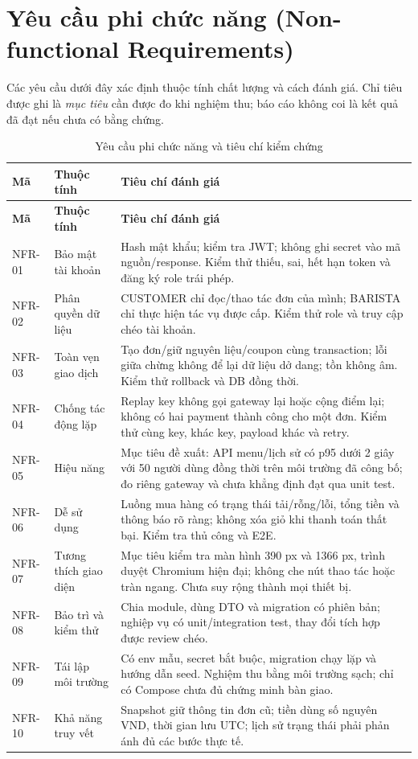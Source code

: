 \section{Yêu cầu phi chức năng (Non-functional Requirements)}
Các yêu cầu dưới đây xác định thuộc tính chất lượng và cách đánh giá.
Chỉ tiêu được ghi là \textit{mục tiêu} cần được đo khi nghiệm thu; báo cáo
không coi là kết quả đã đạt nếu chưa có bằng chứng.
{\small{}
\begin{longtable}{@{}L{0.10\textwidth}L{0.24\textwidth}L{0.59\textwidth}@{}}
\caption{Yêu cầu phi chức năng và tiêu chí kiểm chứng}\label{tab:nonfunctional}\\
\toprule\textbf{Mã} & \textbf{Thuộc tính} & \textbf{Tiêu chí đánh giá} \\\midrule\endfirsthead
\toprule\textbf{Mã} & \textbf{Thuộc tính} & \textbf{Tiêu chí đánh giá} \\\midrule\endhead
\bottomrule\endfoot
NFR-01 & Bảo mật tài khoản & Hash mật khẩu; kiểm tra JWT; không ghi secret vào mã nguồn/response. Kiểm thử thiếu, sai, hết hạn token và đăng ký role trái phép. \\
NFR-02 & Phân quyền dữ liệu & CUSTOMER chỉ đọc/thao tác đơn của mình; BARISTA chỉ thực hiện tác vụ được cấp. Kiểm thử role và truy cập chéo tài khoản. \\
NFR-03 & Toàn vẹn giao dịch & Tạo đơn/giữ nguyên liệu/coupon cùng transaction; lỗi giữa chừng không để lại dữ liệu dở dang; tồn không âm. Kiểm thử rollback và DB đồng thời. \\
NFR-04 & Chống tác động lặp & Replay key không gọi gateway lại hoặc cộng điểm lại; không có hai payment thành công cho một đơn. Kiểm thử cùng key, khác key, payload khác và retry. \\
NFR-05 & Hiệu năng & Mục tiêu đề xuất: API menu/lịch sử có p95 dưới 2 giây với 50 người dùng đồng thời trên môi trường đã công bố; đo riêng gateway và chưa khẳng định đạt qua unit test. \\
NFR-06 & Dễ sử dụng & Luồng mua hàng có trạng thái tải/rỗng/lỗi, tổng tiền và thông báo rõ ràng; không xóa giỏ khi thanh toán thất bại. Kiểm tra thủ công và E2E. \\
NFR-07 & Tương thích giao diện & Mục tiêu kiểm tra màn hình 390 px và 1366 px, trình duyệt Chromium hiện đại; không che nút thao tác hoặc tràn ngang. Chưa suy rộng thành mọi thiết bị. \\
NFR-08 & Bảo trì và kiểm thử & Chia module, dùng DTO và migration có phiên bản; nghiệp vụ có unit/integration test, thay đổi tích hợp được review chéo. \\
NFR-09 & Tái lập môi trường & Có env mẫu, secret bắt buộc, migration chạy lặp và hướng dẫn seed. Nghiệm thu bằng môi trường sạch; chỉ có Compose chưa đủ chứng minh bàn giao. \\
NFR-10 & Khả năng truy vết & Snapshot giữ thông tin đơn cũ; tiền dùng số nguyên VND, thời gian lưu UTC; lịch sử trạng thái phải phản ánh đủ các bước thực tế. \\
\end{longtable}}

